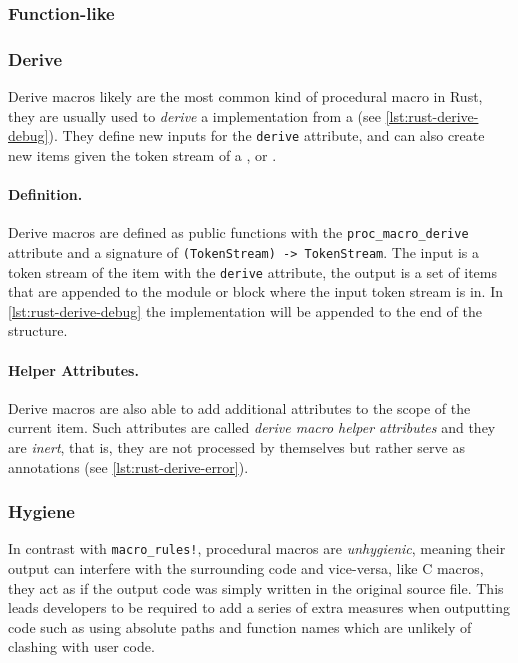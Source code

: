 \subsubsection*{Function-like}

\subsubsection*{Derive}
Derive macros likely are the most common kind of procedural macro in Rust,
they are usually used to \emph{derive} a  implementation from a  (see \autoref{lst:rust-derive-debug}).
They define new inputs for the \texttt{derive} attribute,
and can also create new items given the token stream of a ,  or .

\paragraph{Definition.}%
Derive macros are defined as public functions with the \texttt{proc\_macro\_derive} attribute
and a signature of \texttt{(TokenStream) -> TokenStream}.
The input is a token stream of the item with the \texttt{derive} attribute,
the output is a set of items that are appended to the module or block where the input token stream is in.
In \autoref{lst:rust-derive-debug} the  implementation will be appended to the end of the structure.

\paragraph{Helper Attributes.}%
Derive macros are also able to add additional attributes to the scope of the current item.
Such attributes are called \emph{derive macro helper attributes} and they are \emph{inert},
that is, they are not processed by themselves but rather serve as annotations (see \autoref{lst:rust-derive-error}).

\subsubsection*{Hygiene}
In contrast with \texttt{macro\_rules!}, procedural macros are \emph{unhygienic},
meaning their output can interfere with the surrounding code and vice-versa,
like C macros, they act as if the output code was simply written in the original source file.
This leads developers to be required to add a series of extra measures when outputting code
such as using absolute paths and function names which are unlikely of clashing with user code.


